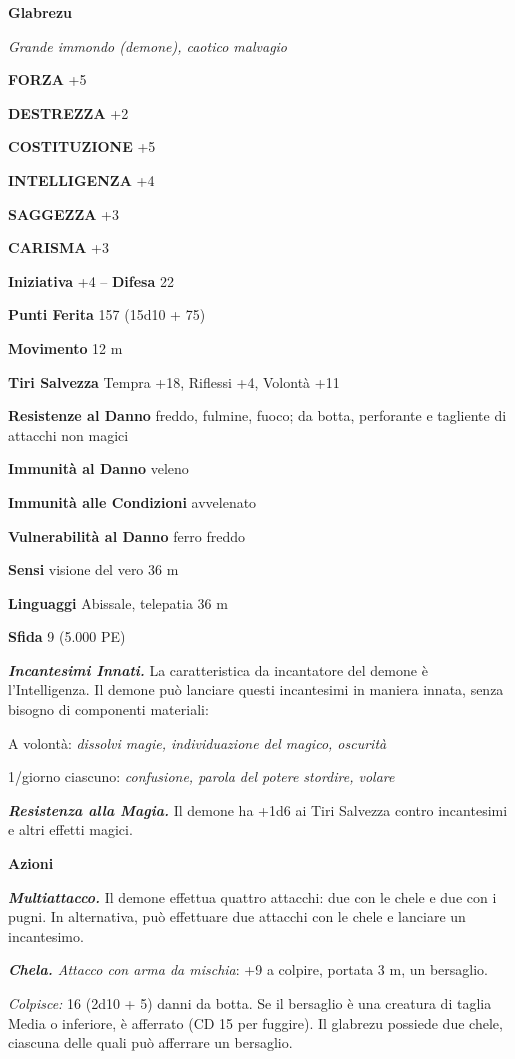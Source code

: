 \begin{multicols}{2}
\medskip{}\textbf{Glabrezu}

\emph{Grande immondo (demone), caotico malvagio}

\textbf{FORZA} +5

\textbf{DESTREZZA} +2

\textbf{COSTITUZIONE} +5

\textbf{INTELLIGENZA} +4

\textbf{SAGGEZZA} +3

\textbf{CARISMA} +3

\textbf{Iniziativa} +4 -- \textbf{Difesa} 22

\textbf{Punti Ferita} 157 (15d10 + 75)

\textbf{Movimento} 12 m

\textbf{Tiri Salvezza} Tempra +18, Riflessi +4, Volontà +11

\textbf{Resistenze al Danno} freddo, fulmine, fuoco; da botta, perforante e tagliente di attacchi non magici

\textbf{Immunità al Danno} veleno

\textbf{Immunità alle Condizioni} avvelenato

\textbf{Vulnerabilità al Danno} ferro freddo

\textbf{Sensi} visione del vero 36 m

\textbf{Linguaggi} Abissale, telepatia 36 m 

\textbf{Sfida} 9 (5.000 PE)

\emph{\textbf{Incantesimi Innati.}} La caratteristica da incantatore del demone è l'Intelligenza. Il demone può lanciare questi incantesimi in maniera innata, senza bisogno di componenti materiali:

A volontà: \emph{dissolvi magie, individuazione del magico, oscurità}

1/giorno ciascuno: \emph{confusione, parola del potere stordire, volare}

\emph{\textbf{Resistenza alla Magia.}} Il demone ha +1d6 ai Tiri Salvezza contro incantesimi e altri effetti magici.

\textbf{Azioni}

\emph{\textbf{Multiattacco.}} Il demone effettua quattro attacchi: due con le chele e due con i pugni. In alternativa, può effettuare due attacchi con le chele e lanciare un incantesimo.

\emph{\textbf{Chela.} Attacco con arma da mischia}: +9 a colpire, portata 3 m, un bersaglio.

\emph{Colpisce:} 16 (2d10 + 5) danni da botta. Se il bersaglio è una creatura di taglia Media o inferiore, è afferrato (CD 15 per fuggire). Il glabrezu possiede due chele, ciascuna delle quali può afferrare un bersaglio.


\end{multicols}
